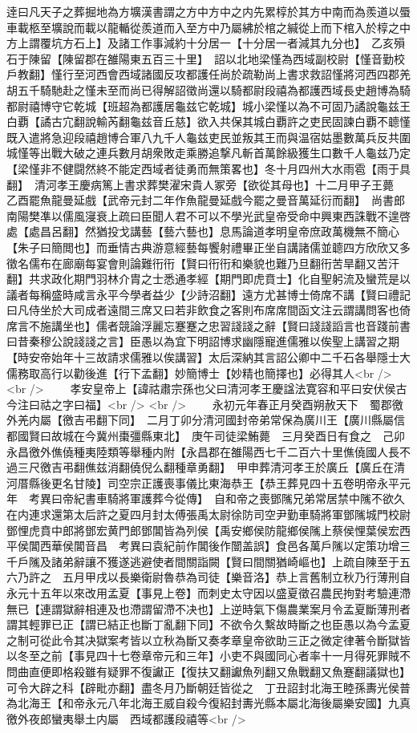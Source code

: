 逹曰凡天子之葬掘地為方壙漢書謂之方中方中之内先累椁於其方中南而為羨道以蜃車載柩至壙說而載以龍輴從羨道而入至方中乃屬紼於棺之緘從上而下棺入於椁之中方上謂覆坑方石上】及諸工作事減約十分居一【十分居一者減其九分也】　乙亥殞石于陳留【陳留郡在雒陽東五百三十里】　詔以北地梁慬為西域副校尉【慬音勤校戶教翻】慬行至河西會西域諸國反攻都護任尚於疏勒尚上書求救詔慬將河西四郡羌胡五千騎馳赴之慬未至而尚已得解詔徵尚還以騎都尉段禧為都護西域長史趙博為騎都尉禧博守它乾城【班超為都護居龜兹它乾城】城小梁慬以為不可固乃譎說龜兹王白覇【譎古宂翻說輸芮翻龜兹音丘慈】欲入共保其城白覇許之吏民固諫白覇不聼慬既入遣將急迎段禧趙博合軍八九千人龜兹吏民並叛其王而與温宿姑墨數萬兵反共圍城慬等出戰大破之連兵數月胡衆敗走乘勝追撃凡斬首萬餘級獲生口數千人龜兹乃定【梁慬非不健闘然終不能定西域者徒勇而無策畧也】冬十月四州大水雨雹【雨于具翻】　清河孝王慶病篤上書求葬樊濯宋貴人冢旁【欲從其母也】十二月甲子王薨　乙酉罷魚龍曼延戲【武帝元封二年作魚龍曼延戲今罷之曼音萬延衍而翻】　尚書郎南陽樊凖以儒風寖衰上疏曰臣聞人君不可以不學光武皇帝受命中興東西誅戰不遑啓處【處昌呂翻】然猶投戈講藝【藝六藝也】息馬論道孝明皇帝庶政萬機無不簡心【朱子曰簡閲也】而垂情古典游意經藝每饗射禮畢正坐自講諸儒並聼四方欣欣又多徵名儒布在廊廟每宴會則論難衎衎【賢曰衎衎和樂貌也難乃旦翻衎苦旱翻又苦汗翻】共求政化期門羽林介胄之士悉通孝經【期門即虎賁士】化自聖躬流及蠻荒是以議者每稱盛時咸言永平今學者益少【少詩沼翻】遠方尤甚博士倚席不講【賢曰禮記曰凡侍坐於大司成者遠間三席又曰若非飲食之客則布席席間函文注云謂講問客也倚席言不施講坐也】儒者競論浮麗忘蹇蹇之忠習諓諓之辭【賢曰諓諓謟言也音踐前書曰昔秦穆公說諓諓之言】臣愚以為宜下明詔博求幽隱寵進儒雅以俟聖上講習之期【時安帝始年十三故請求儒雅以俟講習】太后深納其言詔公卿中二千石各舉隱士大儒務取高行以勸後進【行下孟翻】妙簡博士【妙精也簡擇也】必得其人<br />
<br />
　　孝安皇帝上【諱祜肅宗孫也父曰清河孝王慶諡法寛容和平曰安伏侯古今注曰祜之字曰福】<br />
<br />
　　永初元年春正月癸酉朔赦天下　蜀郡徼外羌内屬【徼吉弔翻下同】　二月丁卯分清河國封帝弟常保為廣川王【廣川縣屬信都國賢曰故城在今冀州棗彊縣東北】　庚午司徒梁鮪薨　三月癸酉日有食之　己卯永昌徼外僬僥種夷陸類等舉種内附【永昌郡在雒陽西七千二百六十里僬僥國人長不過三尺徼吉弔翻僬兹消翻僥倪么翻種章勇翻】　甲申葬清河孝王於廣丘【廣丘在清河厝縣後更名甘陵】司空宗正護喪事儀比東海恭王【恭王葬見四十五卷明帝永平元年　考異曰帝紀書車騎將軍護葬今從傳】　自和帝之喪鄧隲兄弟常居禁中隲不欲久在内連求還第太后許之夏四月封太傅張禹太尉徐防司空尹勤車騎將軍鄧隲城門校尉鄧悝虎賁中郎將鄧宏黄門郎鄧閶皆為列侯【禹安鄉侯防龍鄉侯隲上蔡侯悝葉侯宏西平侯閶西華侯閶音昌　考異曰袁紀前作閶後作闓盖誤】食邑各萬戶隲以定策功增三千戶隲及諸弟辭讓不獲遂逃避使者間關詣闕【賢曰間關猶崎嶇也】上疏自陳至于五六乃許之　五月甲戌以長樂衛尉魯恭為司徒【樂音洛】恭上言舊制立秋乃行薄刑自永元十五年以來改用孟夏【事見上卷】而刺史太守因以盛夏徵召農民拘對考驗連滯無已【連謂獄辭相連及也滯謂留滯不决也】上逆時氣下傷農業案月令孟夏斷薄刑者謂其輕罪已正【謂已結正也斷丁亂翻下同】不欲令久繫故時斷之也臣愚以為今孟夏之制可從此令其决獄案考皆以立秋為斷又奏孝章皇帝欲助三正之微定律著令斷獄皆以冬至之前【事見四十七卷章帝元和三年】小吏不與國同心者率十一月得死罪賊不問曲直便即格殺雖有疑罪不復讞正【復扶又翻讞魚列翻又魚戰翻又魚蹇翻議獄也】可令大辟之科【辟毗亦翻】盡冬月乃斷朝廷皆從之　丁丑詔封北海王睦孫夀光侯普為北海王【和帝永元八年北海王威自殺今復紹封夀光縣本屬北海後屬樂安國】九真徼外夜郎蠻夷舉土内屬　西域都護段禧等<br />
